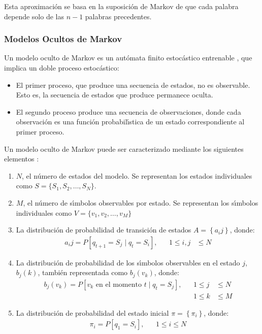 Esta aproximaci\'on se basa en la suposici\'on de Markov de que cada palabra depende solo de las $n - 1$ palabras precedentes.

\subsubsection{Modelos Ocultos de Markov}
Un modelo oculto de Markov es un aut\'omata finito estoc\'astico entrenable \cite{KouemouHistory2011}, que implica un doble 
proceso estoc\'astico:

\begin{itemize}
\item El primer proceso, que produce una secuencia de estados, no es observable. Esto es, la secuencia de estados que produce
permanece oculta.
\item El segundo proceso produce una secuencia de observaciones, donde cada observaci\'on es una funci\'on probabil{\'\i}stica de un estado
correspondiente al primer proceso.
\end{itemize}

Un modelo oculto de Markov puede ser caracterizado mediante los siguientes elementos \cite{Rabiner89atutorial}:

\begin{enumerate}
\item $N$, el n\'umero de estados del modelo. Se representan los estados individuales como $S=\{S_1,S_2,\ldots,S_N\}$.
\item $M$, el n\'umero de s{\'\i}mbolos observables por estado. Se representan los s{\'\i}mbolos individuales como $V=\{v_1,v_2,\ldots,v_M\}$
\item La distribuci\'on de probabilidad de transici\'on de estados $A = \left\{a_ij\right\}$, donde:
\begin{align*}
	a_ij = P[q_{t+1} = S_j \mid q_t = S_i], & & 1 \leq i,j & \leq N
\end{align*}
\item La distribuci\'on de probabilidad de los s{\'\i}mbolos observables en el estado $j$, $b_j(k)$, tambi\'en representada como $b_j(v_k)$, 
donde:
\begin{align*}
	b_j(v_k) = P[v_k \text{ en el momento } t \mid q_t = S_j], & & 1 \leq j & \leq N
	\\& & 1 \leq k & \leq M
\end{align*}
\item La distribuci\'on de probabilidad del estado inicial $\pi=\left\{\pi_i\right\}$, donde:
\begin{align*}
	\pi_i = P[q_1=S_i], & & 1 \leq i \leq N
\end{align*}
\end{enumerate}

